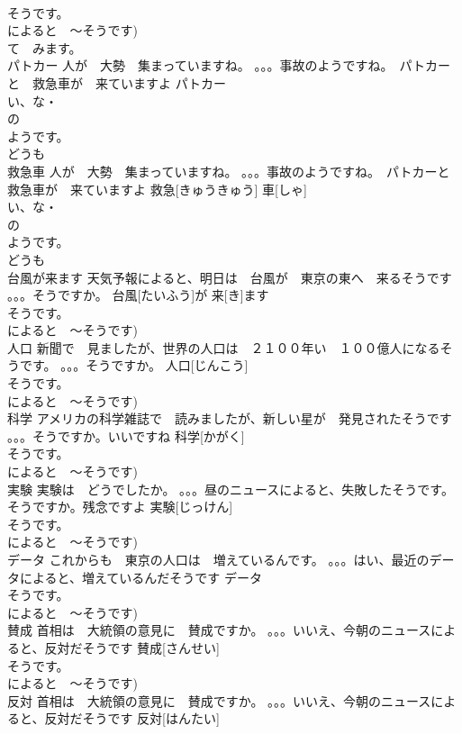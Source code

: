 \documentclass[8pt]{extreport}
\begin{document}
\begin{CJK}{UTF8}{min}
\\	そうです。
\\	によると　～そうです) 
\\	て　みます。
\\	パトカー	人が　大勢　集まっていますね。 。。。事故のようですね。　パトカーと　救急車が　来ていますよ	パトカー			
\\	い、な・
\\	の
\\	ようです。
\\	どうも
\\	救急車	人が　大勢　集まっていますね。 。。。事故のようですね。　パトカーと　救急車が　来ていますよ	救急[きゅうきゅう] 車[しゃ]			
\\	い、な・
\\	の
\\	ようです。
\\	どうも
\\	台風が来ます	天気予報によると、明日は　台風が　東京の東へ　来るそうです 。。。そうですか。	台風[たいふう]が 来[き]ます			
\\	そうです。
\\	によると　～そうです)	
\\	人口	新聞で　見ましたが、世界の人口は　２１００年い　１００億人になるそうです。 。。。そうですか。	人口[じんこう]			
\\	そうです。
\\	によると　～そうです)	
\\	科学	アメリカの科学雑誌で　読みましたが、新しい星が　発見されたそうです 。。。そうですか。いいですね	科学[かがく]			
\\	そうです。
\\	によると　～そうです)	
\\	実験	実験は　どうでしたか。 。。。昼のニュースによると、失敗したそうです。 そうですか。残念ですよ	実験[じっけん]			
\\	そうです。
\\	によると　～そうです)	
\\	データ	これからも　東京の人口は　増えているんです。 。。。はい、最近のデータによると、増えているんだそうです	データ			
\\	そうです。
\\	によると　～そうです)		
\\	賛成	首相は　大統領の意見に　賛成ですか。 。。。いいえ、今朝のニュースによると、反対だそうです	賛成[さんせい]			
\\	そうです。
\\	によると　～そうです)	
\\	反対	首相は　大統領の意見に　賛成ですか。 。。。いいえ、今朝のニュースによると、反対だそうです	反対[はんたい]			

\end{CJK}
\end{document}
